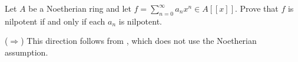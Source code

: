 \begin{exercise}
Let \(A\) be a Noetherian ring and let \(f = \sum_{n=0}^\infty a_n x^n \in A[[x]]\).
Prove that \(f\) is nilpotent if and only if each \(a_n\) is nilpotent.
\end{exercise}

\begin{solution}
(\(\Rightarrow\)) This direction follows from , which does not use the Noetherian assumption.


\end{solution}